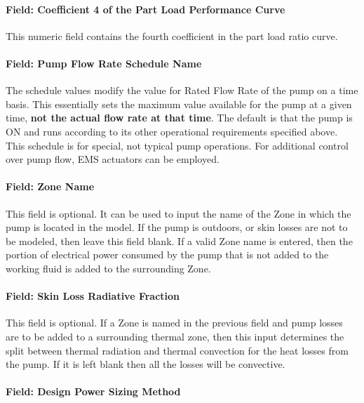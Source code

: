 \paragraph{Field: Coefficient 4 of the Part Load Performance Curve}\label{field-coefficient-4-of-the-part-load-performance-curve-1}

This numeric field contains the fourth coefficient in the part load ratio curve.

\paragraph{Field: Pump Flow Rate Schedule Name}\label{field-pump-flow-rate-schedule-name-2}

The schedule values modify the value for Rated Flow Rate of the pump on a time basis. This essentially sets the maximum value available for the pump at a given time, \textbf{not the actual flow rate at that time}. The default is that the pump is ON and runs according to its other operational requirements specified above. This schedule is for special, not typical pump operations. For additional control over pump flow, EMS actuators can be employed.

\paragraph{Field: Zone Name}\label{field-zone-name-2-004}

This field is optional. It can be used to input the name of the Zone in which the pump is located in the model. If the pump is outdoors, or skin losses are not to be modeled, then leave this field blank. If a valid Zone name is entered, then the portion of electrical power consumed by the pump that is not added to the working fluid is added to the surrounding Zone.

\paragraph{Field: Skin Loss Radiative Fraction}\label{field-skin-loss-radiative-fraction-2}

This field is optional. If a Zone is named in the previous field and pump losses are to be added to a surrounding thermal zone, then this input determines the split between thermal radiation and thermal convection for the heat losses from the pump. If it is left blank then all the losses will be convective.

\paragraph{Field: Design Power Sizing Method}\label{field-design-power-sizing-method-2}

